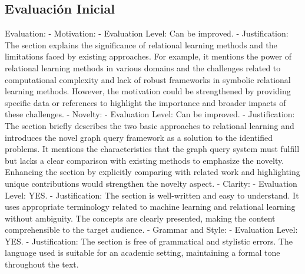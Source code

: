 \documentclass{article}%
\begin{document}
%
\subsection{Evaluación Inicial}%
\label{subsec:EvaluacinInicial}%
Evaluation:\newline%
\newline%
{-} Motivation:\newline%
  {-} Evaluation Level: Can be improved.\newline%
  {-} Justification: The section explains the significance of relational learning methods and the limitations faced by existing approaches. For example, it mentions the power of relational learning methods in various domains and the challenges related to computational complexity and lack of robust frameworks in symbolic relational learning methods. However, the motivation could be strengthened by providing specific data or references to highlight the importance and broader impacts of these challenges.\newline%
\newline%
{-} Novelty:\newline%
  {-} Evaluation Level: Can be improved.\newline%
  {-} Justification: The section briefly describes the two basic approaches to relational learning and introduces the novel graph query framework as a solution to the identified problems. It mentions the characteristics that the graph query system must fulfill but lacks a clear comparison with existing methods to emphasize the novelty. Enhancing the section by explicitly comparing with related work and highlighting unique contributions would strengthen the novelty aspect.\newline%
\newline%
{-} Clarity:\newline%
  {-} Evaluation Level: YES.\newline%
  {-} Justification: The section is well{-}written and easy to understand. It uses appropriate terminology related to machine learning and relational learning without ambiguity. The concepts are clearly presented, making the content comprehensible to the target audience.\newline%
\newline%
{-} Grammar and Style:\newline%
  {-} Evaluation Level: YES.\newline%
  {-} Justification: The section is free of grammatical and stylistic errors. The language used is suitable for an academic setting, maintaining a formal tone throughout the text.\newline%
\end{document}
